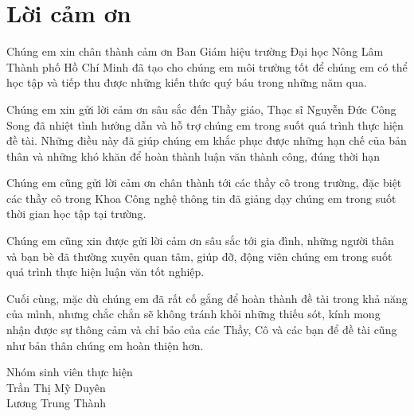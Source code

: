 \chapter*{Lời cảm ơn}
\label{thanks}

Chúng em xin chân thành cảm ơn Ban Giám hiệu trường Đại học Nông Lâm Thành phố Hồ Chí Minh đã tạo cho chúng em môi trường tốt để chúng em có thể học tập và tiếp thu được những kiến thức quý báu trong những năm qua.

Chúng em xin gửi lời cảm ơn sâu sắc đến Thầy giáo, Thạc sĩ Nguyễn Đức Công Song đã nhiệt tình hướng dẫn và hỗ trợ chúng em trong suốt quá trình thực hiện đề tài. Những điều này đã giúp chúng em khắc phục được những hạn chế của bản thân và những khó khăn để hoàn thành luận văn thành công, đúng thời hạn

Chúng em cũng gửi lời cảm ơn chân thành tới các thầy cô trong trường, đặc biệt các thầy cô trong Khoa Công nghệ thông tin đã giảng dạy chúng em trong suốt thời gian học tập tại trường.

Chúng em cũng xin được gửi lời cảm ơn sâu sắc tới gia đình, những người thân và bạn bè đã thường xuyên quan tâm, giúp đỡ, động viên chúng em trong suốt quá trình thực hiện luận văn tốt nghiệp.

Cuối cùng, mặc dù chúng em đã rất cố gắng để hoàn thành đề tài trong khả năng của mình, nhưng chắc chắn sẽ không tránh khỏi những thiếu sót, kính mong nhận được sự thông cảm và chỉ bảo của các Thầy, Cô và các bạn để đề tài cũng như bản thân chúng em hoàn thiện hơn.
\begin{flushright}
    Nhóm sinh viên thực hiện \\
    Trần Thị Mỹ Duyên \\
    Lương Trung Thành
\end{flushright}